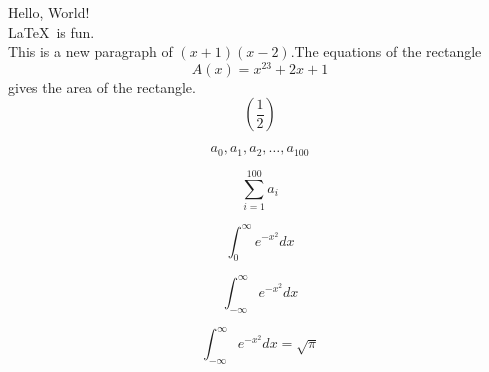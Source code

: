 \documentclass[]{article}
\begin{document}
\noindent
Hello, World!\\\LaTeX\ is fun.\\
\noindent
This is a new paragraph of $(x+1)(x-2)$.The equations of the rectangle
$${A(x)=x^{23}+2x+1}$$gives the area of the rectangle.\\


$$\left(\frac{1}{2}\right)$$

$$a_0,a_1,a_2,\ldots,a_{100}$$

$$\sum_{i=1}^{100}a_i$$

$$\int_{0}^{\infty}e^{-x^2}dx$$

$$\int_{-\infty}^{\infty}e^{-x^2}dx$$

$$\int_{-\infty}^{\infty}e^{-x^2}dx=\sqrt{\pi}$$
\end{document}
